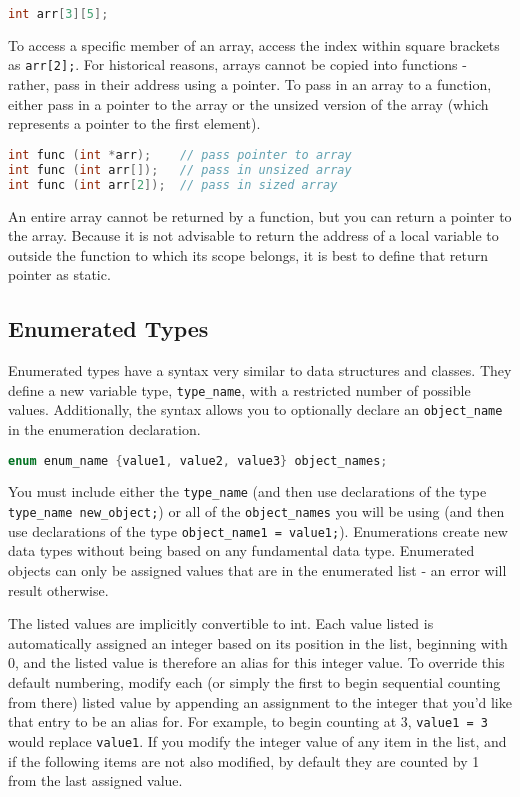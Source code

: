 \documentclass[10pt]{article}
\begin{document}
\begin{lstlisting}[language=C++]
int arr[3][5];
\end{lstlisting}

To access a specific member of an array, access the index within square brackets as \texttt{arr[2];}. For historical reasons, arrays cannot be copied into functions - rather, pass in their address using a pointer. To pass in an array to a function, either pass in a pointer to the array or the unsized version of the array (which represents a pointer to the first element).

\begin{lstlisting}[language=C++]
int func (int *arr); 	// pass pointer to array
int func (int arr[]); 	// pass in unsized array
int func (int arr[2]); 	// pass in sized array
\end{lstlisting}

An entire array cannot be returned by a function, but you can return a pointer to the array. Because it is not advisable to return the address of a local variable to outside the function to which its scope belongs, it is best to define that return pointer as static. 

\subsection{Enumerated Types}

Enumerated types have a syntax very similar to data structures and classes. They define a new variable type, \texttt{type\_name}, with a restricted number of possible values. Additionally, the syntax allows you to optionally declare an \texttt{object\_name} in the enumeration declaration.

\begin{lstlisting}[language=C++]
enum enum_name {value1, value2, value3} object_names;
\end{lstlisting}

You must include either the \texttt{type\_name} (and then use declarations of the type \texttt{type\_name new\_object;}) or all of the \texttt{object\_names} you will be using (and then use declarations of the type \texttt{object\_name1 = value1;}). Enumerations create new data types without being based on any fundamental data type. Enumerated objects can only be assigned values that are in the enumerated list - an error will result otherwise. 

The listed values are implicitly convertible to int. Each value listed is automatically assigned an integer based on its position in the list, beginning with 0, and the listed value is therefore an alias for this integer value. To override this default numbering, modify each (or simply the first to begin sequential counting from there) listed value by appending an assignment to the integer that you'd like that entry to be an alias for. For example, to begin counting at 3, \texttt{value1 = 3} would replace \texttt{value1}. If you modify the integer value of any item in the list, and if the following items are not also modified, by default they are counted by 1 from the last assigned value.
\end{document}
